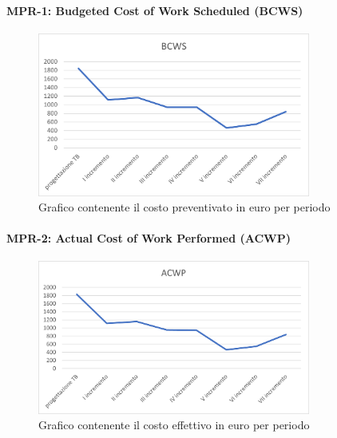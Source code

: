 \paragraph{MPR-1: Budgeted Cost of Work Scheduled (BCWS)}\label{_BCWS}
\begin{figure}[!htb]
    \centering
    \includegraphics[width=0.8\textwidth]{res/images/metriche_costi/BCWS.png}
    \caption{Grafico contenente il costo preventivato in euro per periodo}
\end{figure}

\paragraph{MPR-2: Actual Cost of Work Performed (ACWP)}\label{_ACWP}
\begin{figure}[!htb]
    \centering
    \includegraphics[width=0.8\textwidth]{res/images/metriche_costi/ACWP.png}
    \caption{Grafico contenente il costo effettivo in euro per periodo}
\end{figure}
\newpage

